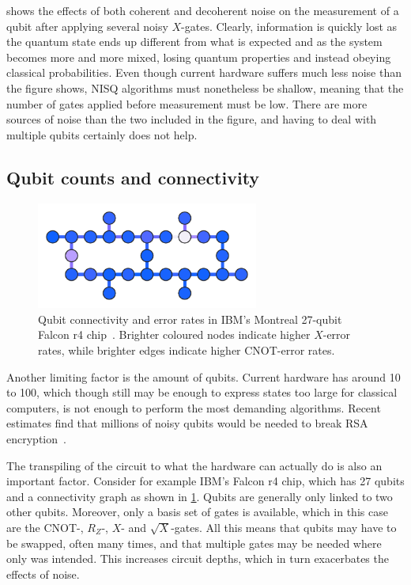  shows the effects of both coherent and decoherent noise on the measurement of a qubit after applying several noisy $X$-gates.
Clearly, information is quickly lost as the quantum state ends up different from what is expected and as the system becomes more and more mixed, losing quantum properties and instead obeying classical probabilities.
Even though current hardware suffers much less noise than the figure shows, NISQ algorithms must nonetheless be shallow, meaning that the number of gates applied before measurement must be low.
There are more sources of noise than the two included in the figure, and having to deal with multiple qubits certainly does not help.

\subsection{Qubit counts and connectivity}
\label{sec:qubit_counts}
\begin{figure}
    \centering
    \includegraphics[width=0.65\textwidth]{connectivity.pdf}
    \caption[
        Qubit connectivity and error rates example.
    ]{
        Qubit connectivity and error rates in IBM's Montreal 27-qubit Falcon r4 chip~\autocite{connectivity}.
        Brighter coloured nodes indicate higher $X$-error rates, while brighter edges indicate higher CNOT-error rates.
    }
    \label{fig:connectivity}
\end{figure}

Another limiting factor is the amount of qubits.
Current hardware has around 10 to 100, which though still may be enough to express states too large for classical computers, is not enough to perform the most demanding algorithms.
Recent estimates find that millions of noisy qubits would be needed to break RSA encryption~\autocite{gidney2021}.

The transpiling of the circuit to what the hardware can actually do is also an important factor.
Consider for example IBM's Falcon r4 chip, which has 27 qubits and a connectivity graph as shown in \cref{fig:connectivity}.
Qubits are generally only linked to two other qubits.
Moreover, only a basis set of gates is available, which in this case are the CNOT-, $R_Z$-, $X$- and $\sqrt{X}$-gates.
All this means that qubits may have to be swapped, often many times, and that multiple gates may be needed where only was intended.
This increases circuit depths, which in turn exacerbates the effects of noise.
